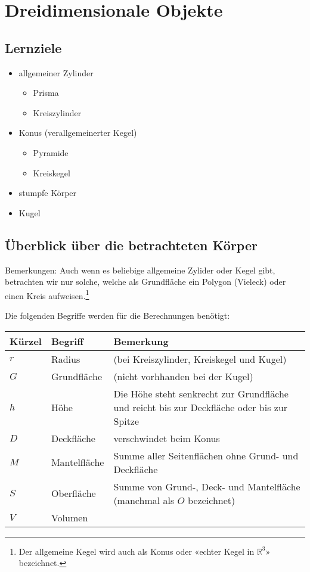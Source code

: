 \section{Dreidimensionale Objekte}


\subsection*{Lernziele}
\begin{itemize}
\item allgemeiner Zylinder
  \begin{itemize}
  \item Prisma
  \item Kreiszylinder
    \end{itemize}
\item Konus (verallgemeinerter Kegel)
  \begin{itemize}
  \item Pyramide
  \item Kreiskegel
  \end{itemize}
  \item stumpfe Körper
  \item Kugel
\end{itemize}
\newpage
\subsection{Überblick über die betrachteten Körper}


Bemerkungen: Auch wenn es beliebige allgemeine Zylider oder Kegel
gibt, betrachten wir nur solche, welche als Grundfläche ein Polygon
(Vieleck) oder einen Kreis aufweisen.\footnote{Der allgemeine Kegel wird auch als Konus oder «echter Kegel in $\mathbb{R}^3$» bezeichnet.}

Die folgenden Begriffe werden für die Berechnungen benötigt:

\begin{tabular}{|l|l|p{12cm}|}
  \hline
  Kürzel & Begriff& Bemerkung\\\hline
  $r$  & Radius & (bei Kreiszylinder, Kreiskegel und Kugel)\\\hline
  $G$  & Grundfläche & (nicht vorhhanden bei der Kugel)\\\hline
  $h$  & Höhe & Die Höhe steht senkrecht zur Grundfläche und reicht bis zur Deckfläche oder bis zur Spitze\\\hline
  $D$  & Deckfläche & verschwindet beim Konus\\\hline
  $M$  & Mantelfläche & Summe aller Seitenflächen ohne Grund- und Deckfläche\\\hline
  $S$  & Oberfläche & Summe von Grund-, Deck- und Mantelfläche
  (manchmal als $O$ bezeichnet)\\\hline
  $V$  & Volumen & \\\hline
  \end{tabular} 
\newpage
